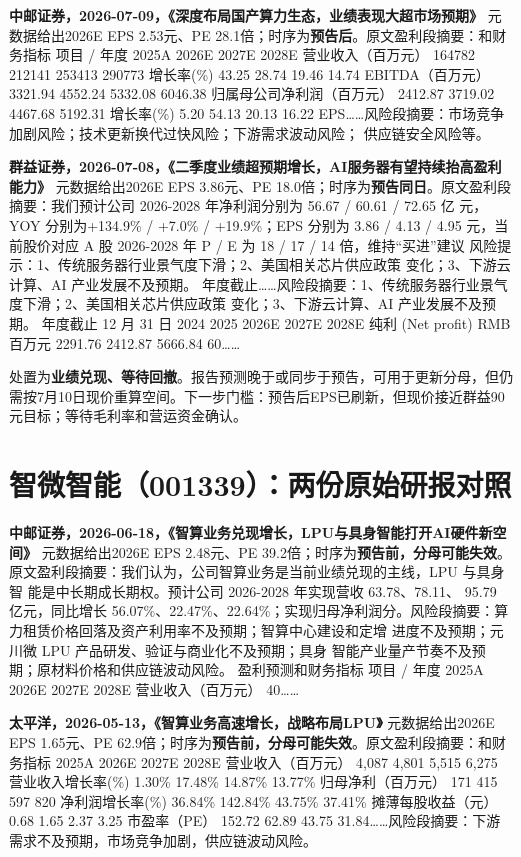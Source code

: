 \textbf{中邮证券，2026-07-09，《深度布局国产算力生态，业绩表现大超市场预期》}
元数据给出2026E EPS 2.53元、PE 28.1倍；时序为\textbf{预告后}。原文盈利段摘要：和财务指标 项目 / 年度 2025A 2026E 2027E 2028E 营业收入（百万元） 164782 212141 253413 290773 增长率(\%) 43.25 28.74 19.46 14.74 EBITDA（百万元） 3321.94 4552.24 5332.08 6046.38 归属母公司净利润（百万元） 2412.87 3719.02 4467.68 5192.31 增长率(\%) 5.20 54.13 20.13 16.22 EPS……风险段摘要：市场竞争加剧风险；技术更新换代过快风险；下游需求波动风险； 供应链安全风险等。

\textbf{群益证券，2026-07-08，《二季度业绩超预期增长，AI服务器有望持续抬高盈利能力》}
元数据给出2026E EPS 3.86元、PE 18.0倍；时序为\textbf{预告同日}。原文盈利段摘要：我们预计公司 2026-2028 年净利润分别为 56.67 / 60.61 / 72.65 亿 元，YOY 分别为+134.9\% / +7.0\% / +19.9\%；EPS 分别为 3.86 / 4.13 / 4.95 元，当 前股价对应 A 股 2026-2028 年 P / E 为 18 / 17 / 14 倍，维持“买进”建议 风险提示：1、传统服务器行业景气度下滑；2、美国相关芯片供应政策 变化；3、下游云计算、AI 产业发展不及预期。 年度截止……风险段摘要：1、传统服务器行业景气度下滑；2、美国相关芯片供应政策 变化；3、下游云计算、AI 产业发展不及预期。 年度截止 12 月 31 日 2024 2025 2026E 2027E 2028E 纯利 (Net profit) RMB 百万元 2291.76 2412.87 5666.84 60……

\begin{keyinsight}[AStock处理]
处置为\textbf{业绩兑现、等待回撤}。报告预测晚于或同步于预告，可用于更新分母，但仍需按7月10日现价重算空间。下一步门槛：预告后EPS已刷新，但现价接近群益90元目标；等待毛利率和营运资金确认。
\end{keyinsight}

\section{智微智能（001339）：两份原始研报对照}

\textbf{中邮证券，2026-06-18，《智算业务兑现增长，LPU与具身智能打开AI硬件新空间》}
元数据给出2026E EPS 2.48元、PE 39.2倍；时序为\textbf{预告前，分母可能失效}。原文盈利段摘要：我们认为，公司智算业务是当前业绩兑现的主线，LPU 与具身智 能是中长期成长期权。预计公司 2026-2028 年实现营收 63.78、78.11、 95.79 亿元，同比增长 56.07\%、22.47\%、22.64\%；实现归母净利润分。风险段摘要：算力租赁价格回落及资产利用率不及预期；智算中心建设和定增 进度不及预期；元川微 LPU 产品研发、验证与商业化不及预期；具身 智能产业量产节奏不及预期；原材料价格和供应链波动风险。 盈利预测和财务指标 项目 / 年度 2025A 2026E 2027E 2028E 营业收入（百万元） 40……

\textbf{太平洋，2026-05-13，《智算业务高速增长，战略布局LPU》}
元数据给出2026E EPS 1.65元、PE 62.9倍；时序为\textbf{预告前，分母可能失效}。原文盈利段摘要：和财务指标 2025A 2026E 2027E 2028E 营业收入（百万元） 4,087 4,801 5,515 6,275 营业收入增长率(\%) 1.30\% 17.48\% 14.87\% 13.77\% 归母净利（百万元） 171 415 597 820 净利润增长率(\%) 36.84\% 142.84\% 43.75\% 37.41\% 摊薄每股收益（元） 0.68 1.65 2.37 3.25 市盈率（PE） 152.72 62.89 43.75 31.84……风险段摘要：下游需求不及预期，市场竞争加剧，供应链波动风险。

